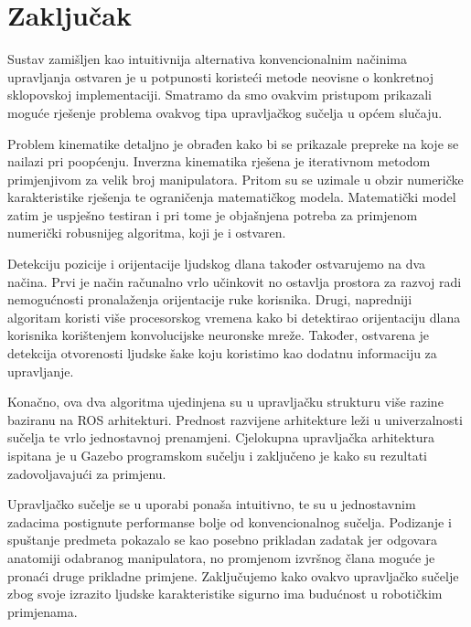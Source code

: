 \documentclass[times, utf8, diplomski, numeric]{fer}
\begin{document}
\chapter{Zaključak}
Sustav zamišljen kao intuitivnija alternativa konvencionalnim načinima upravljanja ostvaren je u potpunosti koristeći metode neovisne o konkretnoj sklopovskoj implementaciji. 
Smatramo da smo ovakvim pristupom prikazali moguće rješenje problema ovakvog tipa upravljačkog sučelja u općem slučaju.

Problem kinematike detaljno je obrađen kako bi se prikazale prepreke na koje se nailazi pri poopćenju.
Inverzna kinematika rješena je iterativnom metodom primjenjivom za velik broj manipulatora.
Pritom su se uzimale u obzir numeričke karakteristike rješenja te ograničenja matematičkog modela.
Matematički model zatim je uspješno testiran i pri tome je objašnjena potreba za primjenom numerički robusnijeg algoritma, koji je i ostvaren.

Detekciju pozicije i orijentacije ljudskog dlana također ostvarujemo na dva načina.
Prvi je način računalno vrlo učinkovit no ostavlja prostora za razvoj radi nemogućnosti pronalaženja orijentacije ruke korisnika.
Drugi, napredniji algoritam koristi više procesorskog vremena kako bi detektirao orijentaciju dlana korisnika korištenjem konvolucijske neuronske mreže.
Također, ostvarena je detekcija otvorenosti ljudske šake koju koristimo kao dodatnu informaciju za upravljanje.

Konačno, ova dva algoritma ujedinjena su u upravljačku strukturu više razine baziranu na ROS arhitekturi.
Prednost razvijene arhitekture leži u univerzalnosti sučelja te vrlo jednostavnoj prenamjeni.
Cjelokupna upravljačka arhitektura ispitana je u Gazebo programskom sučelju i zaključeno je kako su rezultati zadovoljavajući za primjenu.

Upravljačko sučelje se u uporabi ponaša intuitivno, te su u jednostavnim zadacima postignute performanse bolje od konvencionalnog sučelja.
Podizanje i spuštanje predmeta pokazalo se kao posebno prikladan zadatak jer odgovara anatomiji odabranog manipulatora, no promjenom izvršnog člana moguće je pronaći druge prikladne primjene.
Zaključujemo kako ovakvo upravljačko sučelje zbog svoje izrazito ljudske karakteristike sigurno ima budućnost u robotičkim primjenama.



\listoffigures
\listoftables
\clearpage
\appendix
\end{document}
